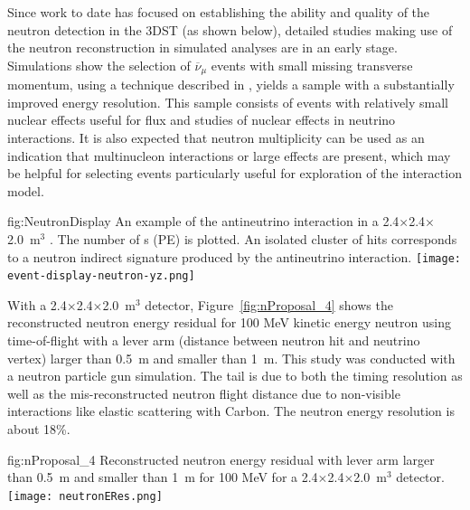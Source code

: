 Since work to date has focused on establishing the ability and quality of the neutron detection in the 3DST (as shown below), detailed studies making use of the neutron reconstruction in simulated analyses are in an early stage.  Simulations show the selection of $\overline{\nu}_\mu$  events with small missing transverse momentum, using a technique described in \cite{Abe:2018pwo}, yields a sample with a substantially improved energy resolution.  This sample consists of events with relatively small nuclear effects useful for flux and studies of nuclear effects in neutrino interactions.  It is also expected that neutron multiplicity can  be used as an indication that multinucleon interactions or large  effects are present, which may be helpful for selecting  events particularly useful for exploration of the interaction model.

\begin{dunefigure}{fig:NeutronDisplay}
{An example of the antineutrino
interaction in a 2.4$\times$2.4$\times$2.0~m$^{3}$ . 
The number of \phel{}s (PE) is plotted.
An isolated cluster of hits 
corresponds to a neutron indirect signature produced by the antineutrino interaction.}
  \texttt{[image: event-display-neutron-yz.png]}
\end{dunefigure}

With a 2.4$\times$2.4$\times$2.0~m$^{3}$  detector, Figure~\ref{fig:nProposal_4} shows 
the reconstructed neutron energy residual for 100 MeV kinetic energy neutron using time-of-flight with a lever arm (distance between neutron hit and neutrino vertex) larger than 0.5~m and smaller than 1~m.
This study was conducted with a neutron particle gun simulation.
The tail is due to both the timing resolution as well as the mis-reconstructed neutron flight distance due to non-visible interactions like elastic scattering with Carbon.
The neutron energy resolution is about 18\%. \\
\begin{dunefigure}{fig:nProposal_4}
{Reconstructed neutron energy residual with lever arm larger than 0.5~m and smaller than 1~m for 100 MeV for a 2.4$\times$2.4$\times$2.0~m$^{3}$  detector.}
  \texttt{[image: neutronERes.png]}
\end{dunefigure}

